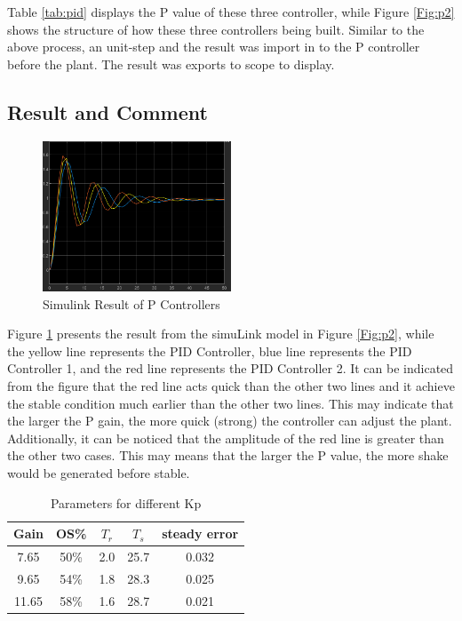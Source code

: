 \documentclass[11pt, a4paper]{article}
\begin{document}
Table \ref{tab:pid} displays the P value of these three controller, while Figure \ref{Fig:p2} shows the structure of how these three controllers being built. Similar to the above process, an unit-step and the result was import in to the P controller before the plant. The result was exports to scope to display.



\subsection{Result and Comment}

\begin{figure}[htbp]     \begin{centering}
    \includegraphics[width=0.5\textwidth]{p2_r.png}
    \caption{ \label{Fig:p2_r}Simulink Result of P Controllers}
    \end{centering}
   
\end{figure}

Figure \ref{Fig:p2_r} presents the result from the simuLink model in Figure \ref{Fig:p2}, while the yellow line represents the PID Controller, blue line represents the PID Controller 1, and the red line represents the PID Controller 2. It can be indicated from the figure that the red line acts quick than the other two lines and it achieve the stable condition much earlier than the other two lines. This may indicate that the larger the P gain, the more quick (strong) the controller can adjust the plant. Additionally, it can be noticed that the amplitude of the red line is greater than the other two cases. This may means that the larger the P value, the more shake would be generated before stable.

\begin{table}[htbp]
\caption{Parameters for different Kp}
\label{tab:resp_2}
\begin{center}
\begin{tabular}{c||cccc}
\hline
Gain   &    OS\%      & $T_{r}$       & $T_{s}$   &  steady error \\
\hline
7.65  &   50\%         & 2.0          &  25.7     &  0.032     \\
9.65  &   54\%         & 1.8          &  28.3     &  0.025     \\
11.65  &   58\%         & 1.6          &  28.7     &  0.021     \\
\hline
\end{tabular}
\end{center}
\end{table}
\end{document}
